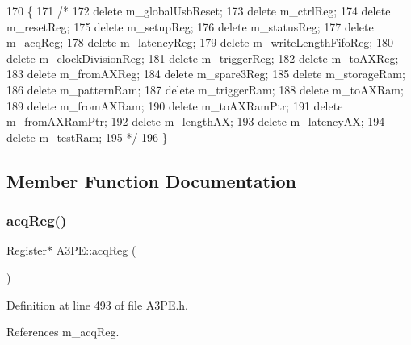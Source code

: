 \begin{DoxyCode}
170          \{
171     \textcolor{comment}{/*}
172 \textcolor{comment}{    delete m\_globalUsbReset;}
173 \textcolor{comment}{    delete m\_ctrlReg;}
174 \textcolor{comment}{    delete m\_resetReg;}
175 \textcolor{comment}{    delete m\_setupReg;}
176 \textcolor{comment}{    delete m\_statusReg;}
177 \textcolor{comment}{    delete m\_acqReg;}
178 \textcolor{comment}{    delete m\_latencyReg;}
179 \textcolor{comment}{    delete m\_writeLengthFifoReg;}
180 \textcolor{comment}{    delete m\_clockDivisionReg;}
181 \textcolor{comment}{    delete m\_triggerReg;}
182 \textcolor{comment}{    delete m\_toAXReg;}
183 \textcolor{comment}{    delete m\_fromAXReg;}
184 \textcolor{comment}{    delete m\_spare3Reg;}
185 \textcolor{comment}{    delete m\_storageRam;}
186 \textcolor{comment}{    delete m\_patternRam;}
187 \textcolor{comment}{    delete m\_triggerRam;}
188 \textcolor{comment}{    delete m\_toAXRam;}
189 \textcolor{comment}{    delete m\_fromAXRam;}
190 \textcolor{comment}{    delete m\_toAXRamPtr;}
191 \textcolor{comment}{    delete m\_fromAXRamPtr;}
192 \textcolor{comment}{    delete m\_lengthAX;}
193 \textcolor{comment}{    delete m\_latencyAX;}
194 \textcolor{comment}{    delete m\_testRam;}
195 \textcolor{comment}{    */}
196   \}
\end{DoxyCode}


\subsection{Member Function Documentation}
\mbox{\label{classA3PE_aca56dadafd70e670e75569ee03d91651}} 
\subsubsection{\texorpdfstring{acq\+Reg()}{acqReg()}}
{\footnotesize\ttfamily \hyperlink{classRegister}{Register}$\ast$ A3\+P\+E\+::acq\+Reg (\begin{DoxyParamCaption}{ }\end{DoxyParamCaption})\hspace{0.3cm}{\ttfamily [inline]}}



Definition at line 493 of file A3\+P\+E.\+h.



References m\+\_\+acq\+Reg.



